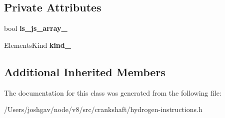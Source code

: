 \subsection*{Private Attributes}
\begin{DoxyCompactItemize}
\item 
bool {\bfseries is\+\_\+js\+\_\+array\+\_\+}\hypertarget{classv8_1_1internal_1_1_h_maybe_grow_elements_a11caf97fb1a2ab46a51a147e8d8e94a4}{}\label{classv8_1_1internal_1_1_h_maybe_grow_elements_a11caf97fb1a2ab46a51a147e8d8e94a4}

\item 
Elements\+Kind {\bfseries kind\+\_\+}\hypertarget{classv8_1_1internal_1_1_h_maybe_grow_elements_a246733e551eb987803f77ea310237a0c}{}\label{classv8_1_1internal_1_1_h_maybe_grow_elements_a246733e551eb987803f77ea310237a0c}

\end{DoxyCompactItemize}
\subsection*{Additional Inherited Members}


The documentation for this class was generated from the following file\+:\begin{DoxyCompactItemize}
\item 
/\+Users/joshgav/node/v8/src/crankshaft/hydrogen-\/instructions.\+h\end{DoxyCompactItemize}
